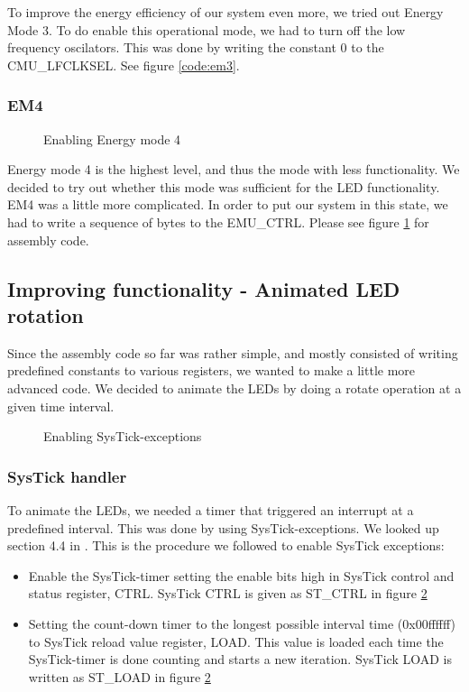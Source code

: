 		To improve the energy efficiency of our system even more, we tried out Energy Mode 3. To do enable this operational mode, we had to turn off the low frequency oscilators. This was done by writing the constant $0$ to the CMU\_LFCLKSEL. See figure \ref{code:em3}.
	
		\subsubsection{EM4}
		\label{subsubsection:em4}
	
		\begin{figure}[t]
			
			\caption{Enabling Energy mode 4}
			\label{code:em4}
		\end{figure}

		Energy mode 4 is the highest level, and thus the mode with less functionality. We decided to try out whether this mode was sufficient for the LED functionality. EM4 was a little more complicated. In order to put our system in this state, we had to write a sequence of bytes to the EMU\_CTRL. Please see figure \ref{code:em4} for assembly code.

	
	\subsection{Improving functionality - Animated LED rotation}
	Since the assembly code so far was rather simple, and mostly consisted of writing predefined constants to various registers, we wanted to make a little more advanced code. We decided to animate the LEDs by doing a rotate operation at a given time interval.
	
\begin{figure}[t]
		
		\caption{Enabling SysTick-exceptions}
		\label{code:systick_enable}
\end{figure}

	\subsubsection{SysTick handler}
	To animate the LEDs, we needed a timer that triggered an interrupt at a predefined interval. This was done by using SysTick-exceptions. We looked up section 4.4 in \cite{cortex_m3_ref_man}. This is the procedure we followed to enable SysTick exceptions:
	\begin{itemize}
	\item Enable the SysTick-timer setting the enable bits high in SysTick control and status register, CTRL. SysTick CTRL is given as ST\_CTRL in figure \ref{code:systick_enable}
	\item Setting the count-down timer to the longest possible interval time (0x00ffffff) to SysTick reload value register, LOAD. This value is loaded each time the SysTick-timer is done counting and starts a new iteration. SysTick LOAD is written as ST\_LOAD in figure \ref{code:systick_enable}
	\end{itemize}
	
